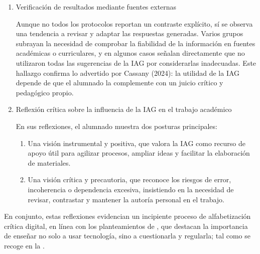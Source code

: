 \documentclass[spanish]{textolivre}
\begin{document}
\begin{enumerate}
    La mayoría de los grupos incluyó ejemplos de \textit{prompts}, lo que aporta transparencia sobre el tipo de interacción mantenida con la IAG. Estos \textit{prompts} oscilan entre peticiones simples (“Revisa este párrafo”) y solicitudes más complejas (“Diseña un cuento adaptado para un alumno con dislexia y otro extranjero”). En este sentido, los futuros docentes no solo usaron la IAG para microtareas, sino también para explorar escenarios de inclusión, creatividad y transversalidad en el diseño de actividades.

    \item Verificación de resultados mediante fuentes externas

    Aunque no todos los protocolos reportan un contraste explícito, sí se observa una tendencia a revisar y adaptar las respuestas generadas. Varios grupos subrayan la necesidad de comprobar la fiabilidad de la información en fuentes académicas o curriculares, y en algunos casos señalan directamente que no utilizaron todas las sugerencias de la IAG por considerarlas inadecuadas. Este hallazgo confirma lo advertido por Cassany (2024): la utilidad de la IAG depende de que el alumnado la complemente con un juicio crítico y pedagógico propio.

    \item Reflexión crítica sobre la influencia de la IAG en el trabajo académico

    En sus reflexiones, el alumnado muestra dos posturas principales:

    \begin{enumerate}
        \item Una visión instrumental y positiva, que valora la IAG como recurso de apoyo útil para agilizar procesos, ampliar ideas y facilitar la elaboración de materiales.
        \item Una visión crítica y precautoria, que reconoce los riesgos de error, incoherencia o dependencia excesiva, insistiendo en la necesidad de revisar, contrastar y mantener la autoría personal en el trabajo.
    \end{enumerate}
\end{enumerate}

En conjunto, estas reflexiones evidencian un incipiente proceso de alfabetización crítica digital, en línea con los planteamientos de \textcite{UbalCamachoTambascoMartinezGarciaCorrea2023,CervantesBarriosMonteceMoranteMeraMedina2024}, que destacan la importancia de enseñar no solo a usar tecnología, sino a cuestionarla y regularla; tal como se recoge en la .
\end{document}
